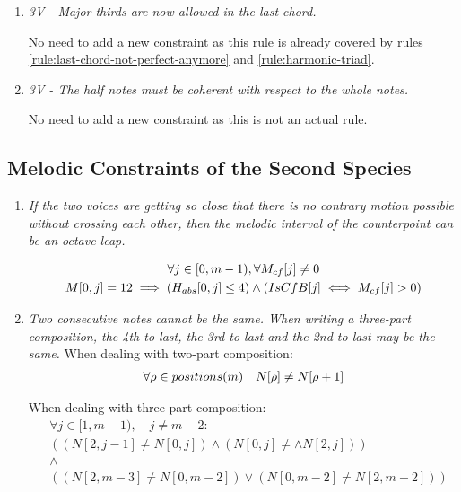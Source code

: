 \begin{enumerate}[wide, label=\bfseries 2.H\arabic*]
\item \textit{3V - Major thirds are now allowed in the last chord.}

No need to add a new constraint as this rule is already covered by rules \ref{rule:last-chord-not-perfect-anymore} and \ref{rule:harmonic-triad}.

\item \textit{3V - The half notes must be coherent with respect to the whole notes.}

No need to add a new constraint as this is not an actual rule.

\end{enumerate}

\subsection*{Melodic Constraints of the Second Species}
\begin{enumerate}[wide, label=\bfseries 2.M\arabic*]

\item\label{rule:octaveleap}{ \textit{If the two voices are getting so close that there is no contrary motion possible without crossing each other, then the melodic interval of the counterpoint can be an octave leap.}}

\begin{equation}
    \begin{gathered}
        \forall j \in [0, m-1), \forall M_{cf}[j] \neq 0\\
        M[0, j] = 12 \implies (H_{abs}[0, j] \leq 4) \land (IsCfB[j] \iff M_{cf}[j]>0)
    \end{gathered}
\end{equation}

\item\label{rule:notsamecons}{ \textit{Two consecutive notes cannot be the same. When writing a three-part composition, the 4th-to-last, the 3rd-to-last and the 2nd-to-last may be the same.}}
When dealing with two-part composition:
\begin{equation}
    \begin{gathered}
        \forall \rho \in positions(m) \quad
        N[\rho] \neq N[\rho+1]
    \end{gathered}
\end{equation}

When dealing with three-part composition:
\begin{equation}
  \begin{aligned}
      &\forall j \in [1, m-1), \quad j \neq m-2:\\
      &((N[2, j-1] \neq N[0, j]) \land (N[0, j] \neq \land N[2, j])) \\
      &\land \\
      & ((N[2, m-3] \neq N[0, m-2]) \lor (N[0, m-2] \neq N[2, m-2]) )
  \end{aligned}
\end{equation}


\end{enumerate}
